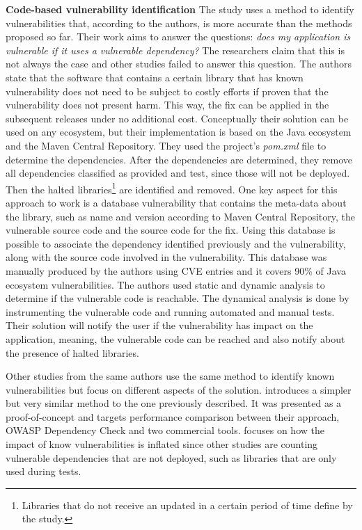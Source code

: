 \documentclass[pdf,bookmarks,colorlinks=true]{IEEEtran}
\begin{document}
\textbf{Code-based vulnerability identification}
The study \cite{Ponta2018} uses a method to identify vulnerabilities that, according to the authors, is more accurate than the methods proposed so far. Their work aims to answer the questions: {\em does my application is vulnerable if it uses a vulnerable dependency?} The researchers claim that this is not always the case and other studies failed to answer this question. The authors state that the software that contains a certain library that has known vulnerability does not need to be subject to costly efforts if proven that the vulnerability does not present harm. This way, the fix can be applied in the subsequent releases under no additional cost. Conceptually their solution can be used on any ecosystem, but their implementation is based on the Java ecosystem and the Maven Central Repository. They used the project’s {\em pom.xml} file to determine the dependencies. After the dependencies are determined, they remove all dependencies classified as provided and test, since those will not be deployed. Then the halted libraries\footnote{Libraries that do not receive an updated in a certain period of time define by the study.} are identified and removed. 
One key aspect for this approach to work is a database vulnerability that contains the meta-data about the library, such as name and version according to Maven Central Repository, the vulnerable source code and the source code for the fix. Using this database is possible to associate the dependency identified previously and the vulnerability, along with the source code involved in the vulnerability. This database was manually produced by the authors using CVE entries and it covers 90\% of Java ecosystem vulnerabilities.
The authors used static and dynamic analysis to determine if the vulnerable code is reachable. The dynamical analysis is done by instrumenting the vulnerable code and running automated and manual tests.
Their solution will notify the user if the vulnerability has impact on the application, meaning, the vulnerable code can be reached and also notify about the presence of halted libraries.

Other studies from the same authors use the same method to identify known vulnerabilities but focus on different aspects of the solution. \cite{Plate2015} introduces a simpler but very similar method to the one previously described. It was presented as a proof-of-concept and targets performance comparison between their approach, OWASP Dependency Check and two commercial tools.  \cite{pashchenko2018esem} focuses on how the impact of know vulnerabilities is inflated since other studies are counting vulnerable dependencies that are not deployed, such as libraries that are only used during tests. 
\end{document}

